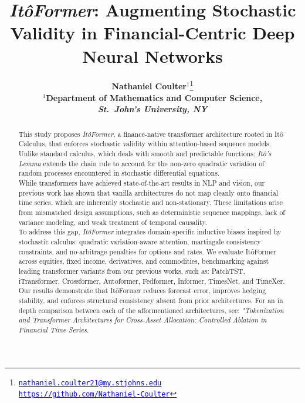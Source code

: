 \documentclass[10pt,twocolumn]{article}
\title{\textbf{\emph{It\^oFormer}: Augmenting Stochastic Validity in Financial-Centric Deep Neural Networks}}
\author{
{\Large \textbf{Nathaniel Coulter}$^{1}$}\thanks{%
  \href{mailto:nathaniel.coulter21@my.stjohns.edu}{\texttt{\textcolor{blue}{nathaniel.coulter21@my.stjohns.edu}}}\\
  \href{https://github.com/Nathaniel-Coulter}{\texttt{\textcolor{blue}{https://github.com/Nathaniel-Coulter}}}%
}
\vspace{-0.5em} \\ 
\small $^{1}$\textbf{Department of Mathematics and Computer Science,\\ \textit{St.~John's University, NY}}
}
\date{}
\begin{document}
\maketitle
\begin{abstract}
This study proposes \emph{It\^oFormer}, a finance-native transformer architecture rooted in It\^o Calculus\cite{ito1944stochastic}, that enforces
stochastic validity within attention-based\cite{vaswani2017attention} sequence models. Unlike standard calculus, which deals with smooth and predictable functions; \emph{It\^o's Lemma} 
extends the chain rule to account for the non-zero quadratic variation of random processes encountered in stochastic differential equations\cite{oksendal2003sde}. \\

While transformers have achieved state-of-the-art results in NLP and vision, our previous work has shown that vanilla architectures do not map cleanly onto financial time series, which are inherently stochastic and non-stationary\cite{coulter2025tokenization,coulter2025neural}. These limitations arise from mismatched design assumptions, such as deterministic sequence mappings, lack of variance modeling, and weak treatment of temporal causality. \\

To address this gap, \emph{It\^oFormer} integrates domain-specific inductive biases inspired by stochastic calculus: quadratic variation-aware attention, martingale consistency constraints, and no-arbitrage penalties for options and rates. We evaluate It\^oFormer across equities, fixed income, derivatives, and commodities, benchmarking against leading transformer variants from our previous works, such as: PatchTST, iTransformer, Crossformer, Autoformer, Fedformer, Informer, TimesNet, and TimeXer. Our results demonstrate that It\^oFormer reduces forecast error, improves hedging stability, and enforces structural consistency absent from prior architectures. 
For an in depth comparison between each of the afformentioned architectures, see: \textit{"Tokenization and Transformer Architectures for Cross-Asset Allocation: Controlled Ablation in Financial Time Series\cite{coulter2025tokenization}}.
\end{abstract}

\begin{minipage}[t]{0.48\textwidth}
  \renewcommand{\contentsname}{Contents}
  \setcounter{tocdepth}{2}
  \small
  \vspace*{-0.5em}
  \tableofcontents
\end{minipage}
\end{document}
